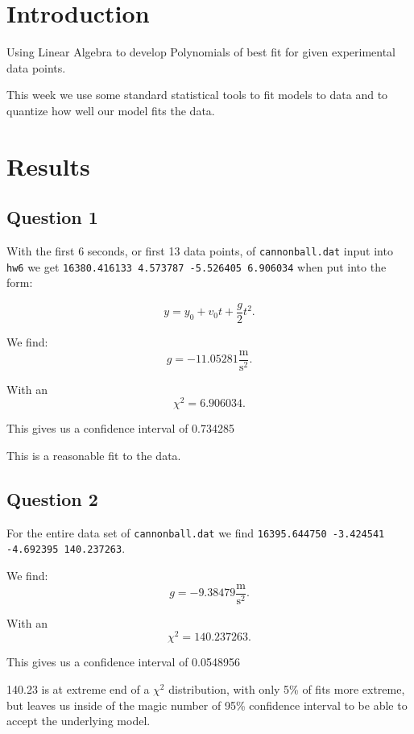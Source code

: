 \documentclass{article}
\author{\hwauthor}
\title{\hwtitle}
\date{\hwdate}
\begin{document}
\maketitle
\thispagestyle{fancy}

\section{Introduction}
 
Using Linear Algebra to develop Polynomials of best fit for given experimental data points.

This week we use some standard statistical tools to fit models to data and to quantize how well our model fits the data.

\section{Results}

\subsection{Question 1}

With the first 6 seconds, or first 13 data points, of \texttt{cannonball.dat} input into \texttt{hw6} we get \texttt{16380.416133	4.573787	-5.526405	6.906034} when put into the form:

\[
	y = y_0 + v_0 t + \frac{g}{2}t^2
.\] 

We find:
\[ 
g=-11.05281 \frac{\text{m}}{\text{s}^2}
.\]

With an \[
\chi^2 = 6.906034
.\] 


This gives us a confidence interval of 0.734285

This is a reasonable fit to the data.

\subsection{Question 2}

For the entire data set of \texttt{cannonball.dat} we find \texttt{16395.644750	-3.424541	-4.692395	140.237263}. 

We find:
\[ 
g=-9.38479 \frac{\text{m}}{\text{s}^2}
.\]

With an \[
\chi^2 = 140.237263
.\] 


This gives us a confidence interval of 0.0548956

140.23 is at extreme end of a $\chi^2$ distribution, with only 5\% of fits more extreme, but leaves us inside of the magic number of 95\% confidence interval to be able to accept the underlying model.
\end{document}
